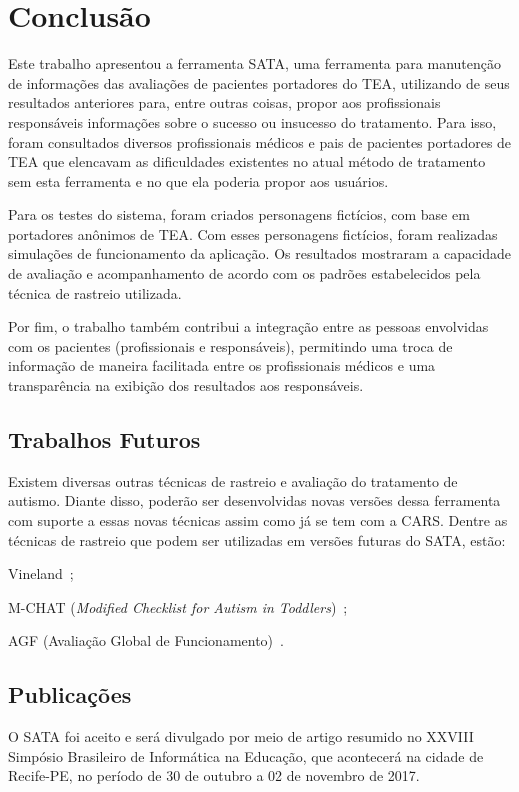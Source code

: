 \chapter{Conclusão}

Este trabalho apresentou a ferramenta SATA, uma ferramenta para manutenção de informações das avaliações de pacientes portadores do TEA, utilizando de seus resultados anteriores para, entre outras coisas, propor aos profissionais responsáveis informações sobre o sucesso ou insucesso do tratamento. Para isso, foram consultados diversos profissionais médicos e pais de pacientes portadores de TEA que elencavam as dificuldades existentes no atual método de tratamento sem esta ferramenta e no que ela poderia propor aos usuários.

Para os testes do sistema, foram criados personagens fictícios, com base em portadores anônimos de TEA. Com esses personagens fictícios, foram realizadas simulações de funcionamento da aplicação. Os resultados mostraram a capacidade de avaliação e acompanhamento de acordo com os padrões estabelecidos pela técnica de rastreio utilizada.

Por fim, o trabalho também contribui a integração entre as pessoas envolvidas com os pacientes (profissionais e responsáveis), permitindo uma troca de informação de maneira facilitada entre os profissionais médicos e uma transparência na exibição dos resultados aos responsáveis.

\section{Trabalhos Futuros}

Existem diversas outras técnicas de rastreio e avaliação do tratamento de autismo. Diante disso, poderão ser desenvolvidas novas versões dessa ferramenta com suporte a essas novas técnicas assim como já se tem com a CARS. Dentre as técnicas de rastreio que podem ser utilizadas em versões futuras do SATA, estão:

\begin{lista}
	\item Vineland~\cite{ferreira:2014};
	\item M-CHAT (\emph{Modified Checklist for Autism in Toddlers})~\cite{robins:2001};
	\item AGF (Avaliação Global de Funcionamento)~\cite{alcantara:2004}.
\end{lista}

\section{Publicações}

O SATA foi aceito e será divulgado por meio de artigo resumido no XXVIII Simpósio Brasileiro de Informática na Educação, que acontecerá na cidade de Recife-PE, no período de 30 de outubro a 02 de novembro de 2017.